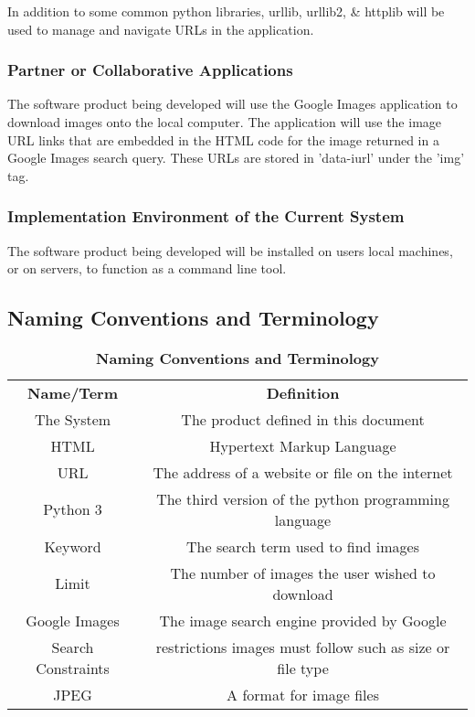 \documentclass[12pt, titlepage]{article}
\begin{document}
In addition to some common python libraries, urllib, urllib2, \& httplib will be used to manage and navigate URLs in the application.

\subsubsection{Partner or Collaborative Applications}

The software product being developed will use the Google Images application to download images onto the local computer. The application will use the image URL links that are embedded in the HTML code for the image returned in a Google Images search query. These URLs are stored in 'data-iurl' under the 'img' tag.

\subsubsection{Implementation Environment of the Current System}

The software product being developed will be installed on users local machines, or on servers, to function as a command line tool.

\newpage

\subsection{Naming Conventions and Terminology}

\begin{table}[ht]
\caption{\bf Naming Conventions and Terminology}
\begin{tabular}{ |c|c| } 
 \hline
 \textbf{Name/Term} & \textbf{Definition}\\ 
 The System & The product defined in this document\\
 HTML & Hypertext Markup Language \\ 
 URL & The address of a website or file on the internet \\ 
 Python 3 & The third version of the python programming language \\
 Keyword & The search term used to find images\\
 Limit & The number of images the user wished to download\\
 Google Images & The image search engine provided by Google\\
 Search Constraints & restrictions images must follow such as size or file type\\
 JPEG & A format for image files\\ 
 
 \hline
\end{tabular}
\end{table}
\end{document}

